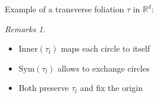 \documentclass[
aspectratio=3218, 
10pt
]{beamer}
\theoremstyle{plain}
\theoremstyle{remark}
\newtheorem*{remark}{Remarks}
\begin{document}
{
\begin{frame}{Example of a transverse foliation $\tau$ in $\mathbb{R}^d$:}
\begin{minipage}[]{0.45\textwidth}
\begin{figure}
\end{figure}
\end{minipage}
\hfill
\begin{minipage}[]{0.45\textwidth}
\begin{remark}\vspace{3pt}
\begin{itemize}
	\item $\mathup{Inner}(\tau_l)$ maps each circle to itself
	\item $\mathup{Sym}(\tau_l)$ allows to exchange circles
	\item Both preserve $\tau_l$ and fix the origin
\end{itemize}
\end{remark}
\end{minipage}
\end{frame}
}
\end{document}
